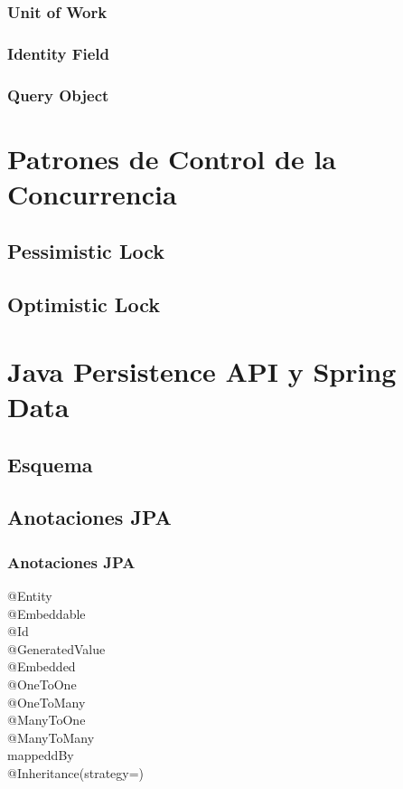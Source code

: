 \documentclass[a4paper,slidestop,xcolor=pst,blue]{beamer}
\begin{document}
\subsubsection{Unit of Work}

\subsubsection{Identity Field}

\subsubsection{Query Object}

\section{Patrones de Control de la Concurrencia}

\subsection{Pessimistic Lock}

\subsection{Optimistic Lock}

\section{Java Persistence API y Spring Data}

\subsection{Esquema}

\subsection{Anotaciones JPA}

\begin{frame}[c]
    \frametitle{Anotaciones JPA}
    \begin{description}
        \item[@Entity]
        \item[@Embeddable]
        \item[@Id]
        \item[@GeneratedValue]
        \item[@Embedded]
        \item[@OneToOne]
        \item[@OneToMany]
        \item[@ManyToOne]
        \item[@ManyToMany]
        \item[mappeddBy]
        \item[@Inheritance(strategy=)]
    \end{description}
\end{frame}
\end{document}
